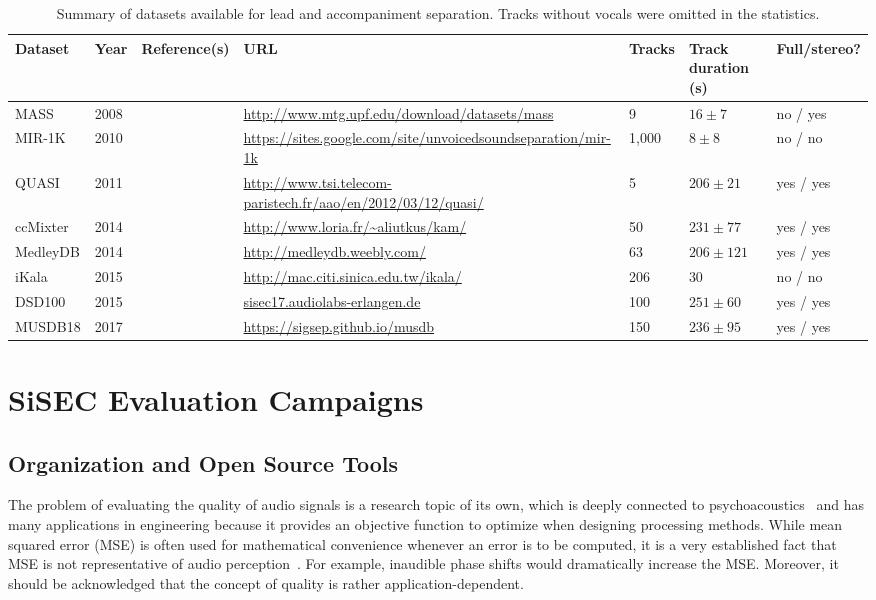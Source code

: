 \begin{table*}[htbp]
	\centering
	\caption{Summary of datasets available for lead and accompaniment separation. Tracks without vocals were omitted in the statistics.}
	\label{tab:datasets}
		\begin{tabular}{|l l l l l l l|}
			\hline
			\textbf{Dataset} & \textbf{Year} & \textbf{Reference(s)} & \textbf{URL} & \textbf{Tracks} & \textbf{Track duration (s)} & \textbf{Full/stereo?}\\
			\hline
			MASS & 2008 & \cite{MTGMASSdb} & \url{http://www.mtg.upf.edu/download/datasets/mass} & 9 & $16 \pm 7$ & no / yes \\
			MIR-1K & 2010 & \cite{hsu10} & \url{https://sites.google.com/site/unvoicedsoundseparation/mir-1k} & 1,000 & $8 \pm 8$ & no / no \\
			QUASI & 2011 & \cite{liutkus11,vincent12} & \url{http://www.tsi.telecom-paristech.fr/aao/en/2012/03/12/quasi/} & 5 & $206 \pm 21$ & yes / yes \\
			ccMixter & 2014 & \cite{liutkus142} & \url{http://www.loria.fr/~aliutkus/kam/} & 50 & $231 \pm 77 $ & yes / yes \\
			MedleyDB & 2014 & \cite{bittner14} & \url{http://medleydb.weebly.com/} & 63 & $206 \pm 121$ & yes / yes \\
			iKala & 2015 & \cite{chan15} & \url{http://mac.citi.sinica.edu.tw/ikala/} & 206 & 30 & no / no \\
			DSD100 & 2015 & \cite{ono15} & \url{sisec17.audiolabs-erlangen.de} & 100 & $251 \pm 60$ & yes / yes \\
      MUSDB18 & 2017 & \cite{rafii17} & \url{https://sigsep.github.io/musdb} & 150 & $236 \pm 95$ & yes / yes \\
			\hline
		\end{tabular}
\end{table*}


\section{SiSEC Evaluation Campaigns}
\label{sec:evaluation}

\subsection{Organization and Open Source Tools}
\label{ssec:background}

The problem of evaluating the quality of audio signals is a research topic of its own, which is deeply connected to psychoacoustics~\cite{zwicker13} and has many applications in engineering because it provides an objective function to optimize when designing processing methods. While mean squared error (MSE) is often used for mathematical convenience whenever an error is to be computed, it is a very established fact that MSE is not representative of audio perception~\cite{rix01,wang09}. For example, inaudible phase shifts would dramatically increase the MSE. Moreover, it should be acknowledged  that the concept of quality is rather application-dependent.

